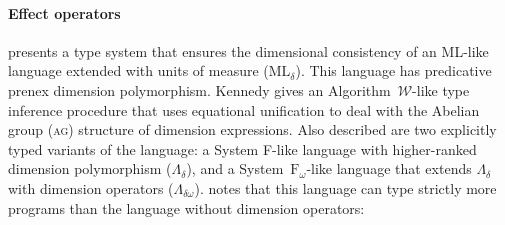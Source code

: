 \documentclass{llncs}
\begin{document}
\paragraph{Effect operators} \cite{KennedyThesis} presents a type system that ensures the dimensional consistency of an ML-like language extended with units of measure ($\mathrm{ML}_\delta$). This language has predicative prenex dimension polymorphism. Kennedy gives an Algorithm~$\mathcal{W}$-like type inference procedure that uses equational unification to deal with the Abelian group (\textsc{ag}) structure of dimension expressions. Also described are two explicitly typed variants of the language: a System F-like language with higher-ranked dimension polymorphism ($\Lambda_\delta$), and a System~$\mathrm{F}_\omega$-like language that extends $\Lambda_\delta$ with dimension operators ($\Lambda_{\delta\omega}$). \cite{KennedyThesis} notes that this language can type strictly more programs than the language without dimension operators:
\end{document}

